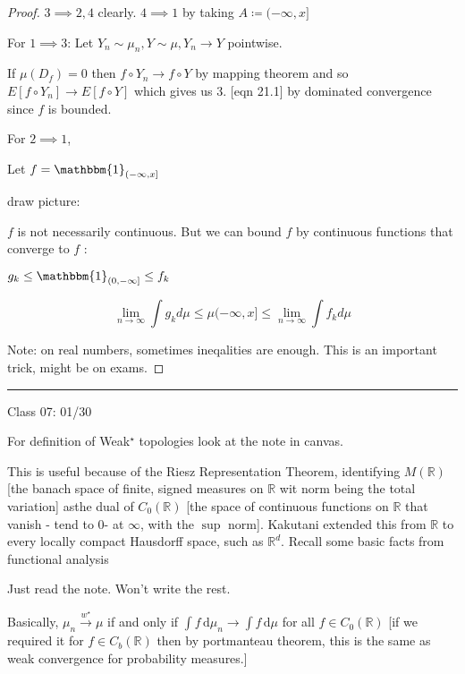 \documentclass{article}
\theoremstyle{definition}
\begin{document}
\begin{proof}
    \(3 \implies 2,4\) clearly. \(4 \implies 1\) by taking \(A\coloneqq (-\infty,x]\) 

    For \(1 \implies 3\): Let \(Y_n \sim \mu _n,Y \sim \mu, Y_n \to Y\) pointwise.

    If \(\mu(D_f)=0\) then \(f\circ Y_n \to f\circ Y\) by mapping theorem and so \(E[f\circ Y_n] \to E[f\circ Y]\) which gives us \(3\). [eqn 21.1] by dominated convergence since \(f\) is bounded.

    For \(2 \implies 1\),

    Let \(f=\mathbbm{1}_{(-\infty ,x]} \) 

    draw picture:

    \(f\) is not necessarily continuous. But we can bound \(f\) by continuous functions that converge to \(f\) :
    
    \(g_k \leq \mathbbm{1}_{(0,-\infty ]} \leq f_k \) 

    \[
        \lim_{n \to \infty} \int g_k d\mu \leq \mu(-\infty,x] \leq \lim_{n \to \infty} \int f_k d\mu 
    \]

    Note: on real numbers, sometimes ineqalities are enough. This is an important trick, might be on exams.

\end{proof}

\hfil
\hrule

Class 07: 01/30

For definition of Weak\(^{\star}\) topologies look at the note in canvas.

This is useful because of the Riesz Representation Theorem, identifying \(M(\mathbb{R})\) [the banach space of finite, signed measures on \(\mathbb{R} \) wit norm being the total variation] asthe dual of \(C_0(\mathbb{R})\) [the space of continuous functions on \(\mathbb{R}\) that vanish - tend to \(0\)- at \(\infty\), with the \(\sup\) norm]. Kakutani extended this from \(\mathbb{R} \) to every locally compact Hausdorff space, such as \(\mathbb{R}^d\). Recall some basic facts from functional analysis

Just read the note. Won't write the rest.

Basically, \(\mu_n \overset{w^{\star} }{\to } \mu \) if and only if \(\int f\,\mathrm{d} \mu _n \to \int f\,\mathrm{d} \mu \) for all \(f\in C_0(\mathbb{R})\) [if we required it for \(f\in C_b(\mathbb{R})\) then by portmanteau theorem, this is the same as weak convergence for probability measures.]
\end{document}
